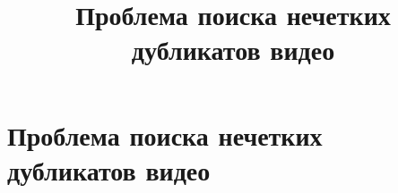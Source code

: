 \documentclass{.local/lib/classes/ndvr-super-article-standalone}
\title[NDVR thesis-abstract]{%
    Проблема поиска нечетких дубликатов видео%
}
\begin{document}
    \standalonetoc

    \section{Проблема поиска нечетких дубликатов видео}

    \begin{shiftdownsection}
    \end{shiftdownsection}

\end{document}

